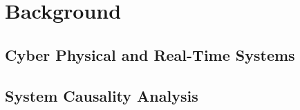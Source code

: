 \section{Background}
\label{sec:background}

\subsection{Cyber Physical and Real-Time Systems}



\subsection{System Causality Analysis} 



